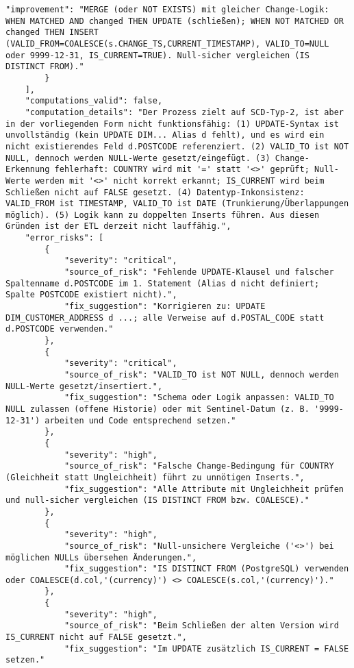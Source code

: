 \begin{lstlisting}[caption={Ausgabe: GPT-5 Anwendungsfall 9 Robustheitsdurchlauf},label={gpt_case9_prompt3}]
            "improvement": "MERGE (oder NOT EXISTS) mit gleicher Change-Logik: WHEN MATCHED AND changed THEN UPDATE (schließen); WHEN NOT MATCHED OR changed THEN INSERT (VALID_FROM=COALESCE(s.CHANGE_TS,CURRENT_TIMESTAMP), VALID_TO=NULL oder 9999-12-31, IS_CURRENT=TRUE). Null-sicher vergleichen (IS DISTINCT FROM)."
        }
    ],
    "computations_valid": false,
    "computation_details": "Der Prozess zielt auf SCD-Typ-2, ist aber in der vorliegenden Form nicht funktionsfähig: (1) UPDATE-Syntax ist unvollständig (kein UPDATE DIM... Alias d fehlt), und es wird ein nicht existierendes Feld d.POSTCODE referenziert. (2) VALID_TO ist NOT NULL, dennoch werden NULL-Werte gesetzt/eingefügt. (3) Change-Erkennung fehlerhaft: COUNTRY wird mit '=' statt '<>' geprüft; Null-Werte werden mit '<>' nicht korrekt erkannt; IS_CURRENT wird beim Schließen nicht auf FALSE gesetzt. (4) Datentyp-Inkonsistenz: VALID_FROM ist TIMESTAMP, VALID_TO ist DATE (Trunkierung/Überlappungen möglich). (5) Logik kann zu doppelten Inserts führen. Aus diesen Gründen ist der ETL derzeit nicht lauffähig.",
    "error_risks": [
        {
            "severity": "critical",
            "source_of_risk": "Fehlende UPDATE-Klausel und falscher Spaltenname d.POSTCODE im 1. Statement (Alias d nicht definiert; Spalte POSTCODE existiert nicht).",
            "fix_suggestion": "Korrigieren zu: UPDATE DIM_CUSTOMER_ADDRESS d ...; alle Verweise auf d.POSTAL_CODE statt d.POSTCODE verwenden."
        },
        {
            "severity": "critical",
            "source_of_risk": "VALID_TO ist NOT NULL, dennoch werden NULL-Werte gesetzt/insertiert.",
            "fix_suggestion": "Schema oder Logik anpassen: VALID_TO NULL zulassen (offene Historie) oder mit Sentinel-Datum (z. B. '9999-12-31') arbeiten und Code entsprechend setzen."
        },
        {
            "severity": "high",
            "source_of_risk": "Falsche Change-Bedingung für COUNTRY (Gleichheit statt Ungleichheit) führt zu unnötigen Inserts.",
            "fix_suggestion": "Alle Attribute mit Ungleichheit prüfen und null-sicher vergleichen (IS DISTINCT FROM bzw. COALESCE)."
        },
        {
            "severity": "high",
            "source_of_risk": "Null-unsichere Vergleiche ('<>') bei möglichen NULLs übersehen Änderungen.",
            "fix_suggestion": "IS DISTINCT FROM (PostgreSQL) verwenden oder COALESCE(d.col,'(currency)') <> COALESCE(s.col,'(currency)')."
        },
        {
            "severity": "high",
            "source_of_risk": "Beim Schließen der alten Version wird IS_CURRENT nicht auf FALSE gesetzt.",
            "fix_suggestion": "Im UPDATE zusätzlich IS_CURRENT = FALSE setzen."

\end{lstlisting}
